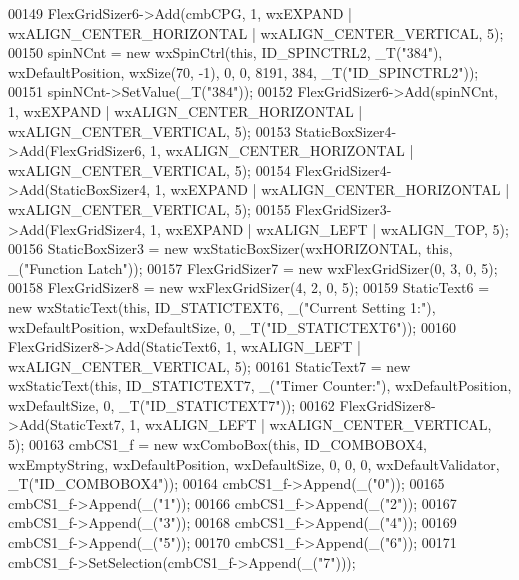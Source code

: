 \begin{DoxyCode}
00149     FlexGridSizer6->Add(cmbCPG, 1, wxEXPAND | wxALIGN\_CENTER\_HORIZONTAL | wxALIGN\_CENTER\_VERTICAL, 5);
00150     spinNCnt = \textcolor{keyword}{new} wxSpinCtrl(\textcolor{keyword}{this}, ID\_SPINCTRL2, _T(\textcolor{stringliteral}{"384"}), wxDefaultPosition, wxSize(70, -1), 0, 0, 8191,
       384, _T(\textcolor{stringliteral}{"ID\_SPINCTRL2"}));
00151     spinNCnt->SetValue(_T(\textcolor{stringliteral}{"384"}));
00152     FlexGridSizer6->Add(spinNCnt, 1, wxEXPAND | wxALIGN\_CENTER\_HORIZONTAL | wxALIGN\_CENTER\_VERTICAL, 5);
00153     StaticBoxSizer4->Add(FlexGridSizer6, 1, wxALIGN\_CENTER\_HORIZONTAL | wxALIGN\_CENTER\_VERTICAL, 5);
00154     FlexGridSizer4->Add(StaticBoxSizer4, 1, wxEXPAND | wxALIGN\_CENTER\_HORIZONTAL | wxALIGN\_CENTER\_VERTICAL,
       5);
00155     FlexGridSizer3->Add(FlexGridSizer4, 1, wxEXPAND | wxALIGN\_LEFT | wxALIGN\_TOP, 5);
00156     StaticBoxSizer3 = \textcolor{keyword}{new} wxStaticBoxSizer(wxHORIZONTAL, \textcolor{keyword}{this}, \_(\textcolor{stringliteral}{"Function Latch"}));
00157     FlexGridSizer7 = \textcolor{keyword}{new} wxFlexGridSizer(0, 3, 0, 5);
00158     FlexGridSizer8 = \textcolor{keyword}{new} wxFlexGridSizer(4, 2, 0, 5);
00159     StaticText6 = \textcolor{keyword}{new} wxStaticText(\textcolor{keyword}{this}, ID\_STATICTEXT6, \_(\textcolor{stringliteral}{"Current Setting 1:"}), wxDefaultPosition, 
      wxDefaultSize, 0, _T(\textcolor{stringliteral}{"ID\_STATICTEXT6"}));
00160     FlexGridSizer8->Add(StaticText6, 1, wxALIGN\_LEFT | wxALIGN\_CENTER\_VERTICAL, 5);
00161     StaticText7 = \textcolor{keyword}{new} wxStaticText(\textcolor{keyword}{this}, ID\_STATICTEXT7, \_(\textcolor{stringliteral}{"Timer Counter:"}), wxDefaultPosition, 
      wxDefaultSize, 0, _T(\textcolor{stringliteral}{"ID\_STATICTEXT7"}));
00162     FlexGridSizer8->Add(StaticText7, 1, wxALIGN\_LEFT | wxALIGN\_CENTER\_VERTICAL, 5);
00163     cmbCS1\_f = \textcolor{keyword}{new} wxComboBox(\textcolor{keyword}{this}, ID\_COMBOBOX4, wxEmptyString, wxDefaultPosition, wxDefaultSize, 0, 0, 0,
       wxDefaultValidator, _T(\textcolor{stringliteral}{"ID\_COMBOBOX4"}));
00164     cmbCS1\_f->Append(\_(\textcolor{stringliteral}{"0"}));
00165     cmbCS1\_f->Append(\_(\textcolor{stringliteral}{"1"}));
00166     cmbCS1\_f->Append(\_(\textcolor{stringliteral}{"2"}));
00167     cmbCS1\_f->Append(\_(\textcolor{stringliteral}{"3"}));
00168     cmbCS1\_f->Append(\_(\textcolor{stringliteral}{"4"}));
00169     cmbCS1\_f->Append(\_(\textcolor{stringliteral}{"5"}));
00170     cmbCS1\_f->Append(\_(\textcolor{stringliteral}{"6"}));
00171     cmbCS1\_f->SetSelection(cmbCS1\_f->Append(\_(\textcolor{stringliteral}{"7"})));

\end{DoxyCode}
